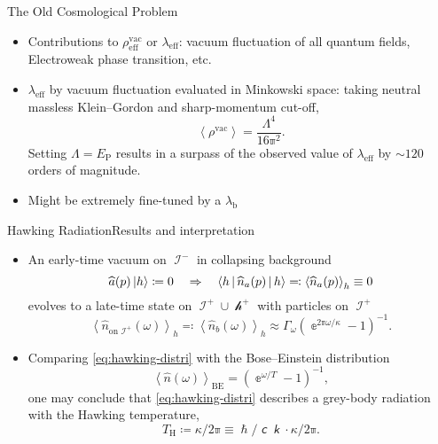 \documentclass{beamer}
\newcommand{\ee}{{\Bbbe}}
\newcommand{\pp}{{\Bbbpi}}
\newcommand{\lc}{\mitsansc} %
\newcommand{\bk}{\mitsansk} %
\newcommand{\phs}{\hslash} %
\newcommand{\rbr}[1]{{\left(#1\right)}}
\newcommand{\abr}[1]{{\left<#1\right>}}
\newcommand{\rfun}[2]{{#1}\mathopen{}\left(#2\right)\mathclose{}}
\newcommand{\what}[1]{{\widehat{#1}}}
\begin{document}
\begin{frame}{The Old Cosmological Problem}
\begin{itemize}

\item Contributions to $\rho^\text{vac}_\text{eff}$ or $\lambda_\text{eff}$:
vacuum fluctuation of all quantum fields, Electroweak phase transition, etc.

\item $\lambda_\text{eff}$ by vacuum fluctuation evaluated in Minkowski space:
taking neutral massless Klein--Gordon and sharp-momentum cut-off,
\begin{equation}
\left<\rho^\text{vac}\right> = \frac{\Lambda^4}{16\pp^2}.
\end{equation}
Setting $\Lambda = E_\text{P}$ results in a surpass of the observed value of
$\lambda_\text{eff}$ by $\sim 120$ orders of magnitude.

\item Might be extremely fine-tuned by a $\lambda_\text{b}$

\end{itemize}

\end{frame}

\begin{frame}{Hawking Radiation}{Results and interpretation 
}

\begin{itemize}
\item An early-time \alert{vacuum} on $\mscrI^-$ in collapsing background
\begin{equation}
\rfun{\what{a}}{p}\Ket{h} \coloneqq 0\quad\Rightarrow\quad
\Braket{h | \rfun{\what{n}_a}{p} | h} \eqqcolon \abr{\rfun{\what{n}_a}{p}}_h 
\equiv 0
\end{equation}
evolves to a late-time state on $\mscrI^+\cup\mscrh^+$ \alert{with particles} 
on $\mscrI^+$
\begin{equation}
\abr{\rfun{\what{n}_{\text{on }\mscrI^+}}{\omega}}_h \eqqcolon
\abr{\rfun{\what{n}_b}{\omega}}_h \approx
\Gamma_\omega\rbr{\ee^{2\pp\omega/\kappa}-1}^{-1}.
\label{eq:hawking-distri}
\end{equation}
\item Comparing \cref{eq:hawking-distri} with the Bose--Einstein distribution
\begin{equation}
\abr{\rfun{\what{n}}{\omega}}_\text{BE} = \rbr{\ee^{\omega/T} - 1}^{-1}, 
\end{equation}
one may conclude that \cref{eq:hawking-distri} describes a grey-body
radiation with the \alert{Hawking temperature},
\begin{equation}
T_\text{H} \coloneqq \kappa/2\pp \equiv \phs/\lc\bk \cdot \kappa/2\pp.
\end{equation}

\end{itemize}

\end{frame}
\end{document}

